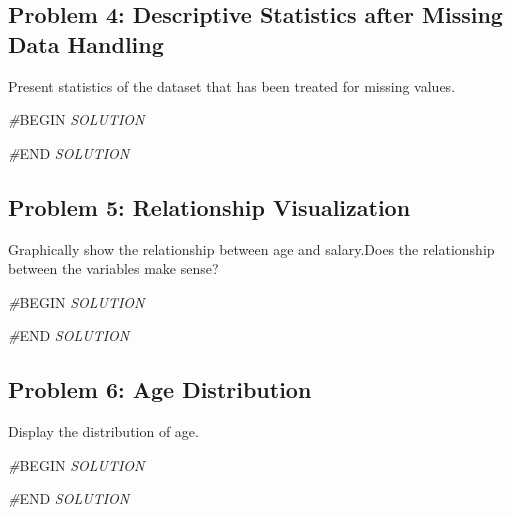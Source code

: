 \documentclass[
]{article}
\newenvironment{Shaded}{\begin{snugshade}}{\end{snugshade}}
\newcommand{\CommentTok}[1]{\textcolor[rgb]{0.56,0.35,0.01}{\textit{#1}}}
\newcommand{\RegionMarkerTok}[1]{#1}
\begin{document}
\hypertarget{problem-4-descriptive-statistics-after-missing-data-handling}{%
\subsection{Problem 4: Descriptive Statistics after Missing Data
Handling}\label{problem-4-descriptive-statistics-after-missing-data-handling}}

Present statistics of the dataset that has been treated for missing
values.

\begin{Shaded}
\begin{Highlighting}[]
\CommentTok{\#}\RegionMarkerTok{BEGIN}\CommentTok{ SOLUTION}

\CommentTok{\#}\RegionMarkerTok{END}\CommentTok{ SOLUTION}
\end{Highlighting}
\end{Shaded}

\hypertarget{problem-5-relationship-visualization}{%
\subsection{Problem 5: Relationship
Visualization}\label{problem-5-relationship-visualization}}

Graphically show the relationship between age and salary.Does the
relationship between the variables make sense?

\begin{Shaded}
\begin{Highlighting}[]
\CommentTok{\#}\RegionMarkerTok{BEGIN}\CommentTok{ SOLUTION}

\CommentTok{\#}\RegionMarkerTok{END}\CommentTok{ SOLUTION}
\end{Highlighting}
\end{Shaded}

\hypertarget{problem-6-age-distribution}{%
\subsection{Problem 6: Age
Distribution}\label{problem-6-age-distribution}}

Display the distribution of age.

\begin{Shaded}
\begin{Highlighting}[]
\CommentTok{\#}\RegionMarkerTok{BEGIN}\CommentTok{ SOLUTION}

\CommentTok{\#}\RegionMarkerTok{END}\CommentTok{ SOLUTION}
\end{Highlighting}
\end{Shaded}
\end{document}

